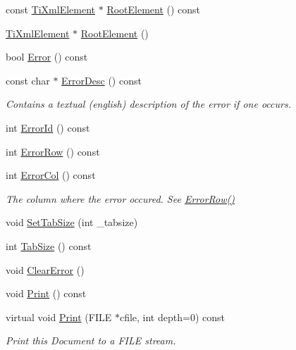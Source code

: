 \begin{DoxyCompactItemize}
\item 
const \hyperlink{class_ti_xml_element}{Ti\+Xml\+Element} $\ast$ \hyperlink{class_ti_xml_document_ab54e3a93279fcf0ac80f06ed9c52f04a}{Root\+Element} () const
\item 
\hyperlink{class_ti_xml_element}{Ti\+Xml\+Element} $\ast$ \hyperlink{class_ti_xml_document_a0b43e762a23f938b06651bc90b8a1013}{Root\+Element} ()
\item 
bool \hyperlink{class_ti_xml_document_a348e68faad4a3498f413c51ee9bc321a}{Error} () const
\item 
const char $\ast$ \hyperlink{class_ti_xml_document_aab511be262e84a003e3bb86f0215c8c2}{Error\+Desc} () const
\begin{DoxyCompactList}\small\item\em Contains a textual (english) description of the error if one occurs. \end{DoxyCompactList}\item 
int \hyperlink{class_ti_xml_document_abd928b49a646c8ed53e0453c555d96a2}{Error\+Id} () const
\item 
int \hyperlink{class_ti_xml_document_a062e5257128a7da31b0b2e38cd524600}{Error\+Row} () const
\item 
int \hyperlink{class_ti_xml_document_adea69de889449a2587afb8ee043f43f5}{Error\+Col} () const
\begin{DoxyCompactList}\small\item\em The column where the error occured. See \hyperlink{class_ti_xml_document_a062e5257128a7da31b0b2e38cd524600}{Error\+Row()} \end{DoxyCompactList}\item 
void \hyperlink{class_ti_xml_document_a51dac56316f89b35bdb7d0d433ba988e}{Set\+Tab\+Size} (int \+\_\+tabsize)
\item 
int \hyperlink{class_ti_xml_document_a81e6ffeee8f5d025a171eabf79abdad7}{Tab\+Size} () const
\item 
void \hyperlink{class_ti_xml_document_ac66b8c28db86363315712a3574e87c35}{Clear\+Error} ()
\item 
void \hyperlink{class_ti_xml_document_aa4e8c1498a76dcde7191c683e1220882}{Print} () const
\item 
virtual void \hyperlink{class_ti_xml_document_aa9e166fae51da603641380a964f21eeb}{Print} (F\+I\+LE $\ast$cfile, int depth=0) const
\begin{DoxyCompactList}\small\item\em Print this Document to a F\+I\+LE stream. \end{DoxyCompactList}\item 

\end{DoxyCompactItemize}
